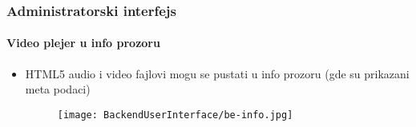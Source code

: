 
\begin{frame}[fragile]
	\frametitle{Administratorski interfejs}
	\framesubtitle{Video plejer u info prozoru}
	\begin{itemize}
		\item HTML5 audio i video fajlovi mogu se pustati u info prozoru \newline
			(gde su prikazani meta podaci)
		\begin{figure}
			\texttt{[image: BackendUserInterface/be-info.jpg]}
		\end{figure}

	\end{itemize}

\end{frame}

